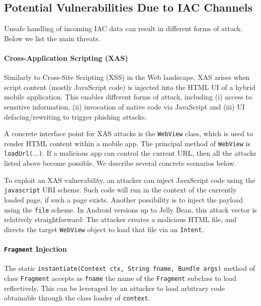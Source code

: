 
\subsection{Potential Vulnerabilities Due to IAC Channels}\label{Se:attackSurface}

Unsafe handling of incoming IAC data can result in different forms of attack. Below we list the main threats.

\paragraph{Cross-Application Scripting (XAS)} Similarly to Cross-Site Scripting (XSS) in the Web landscape, XAS arises when script content (mostly JavaScript code) is injected into the HTML UI of a hybrid mobile application. This enables different forms of attack, including (i) access to sensitive information, (ii) invocation of native code via JavaScript and (iii) UI defacing/rewriting to trigger phishing attacks.

A concrete interface point for XAS attacks is the {\tt WebView} class, which is used to render HTML content within a mobile app. The principal method of {\tt WebView} is {\tt loadUrl($\ldots$)}. If a malicious app can control the current URL, then all the attacks listed above become possible. We describe several concrete scenarios below.

To exploit an XAS vulnerability, an attacker can inject JavaScript code using the {\tt javascript} URI scheme. Such code will run in the context of the currently loaded page, if such a page exists. Another possibility is to inject the payload using the {\tt file} scheme. In Android versions up to Jelly Bean, this attack vector is relatively straightforward: The attacker creates a malicious HTML file, and directs the target {\tt WebView} object to load that file via an {\tt Intent}.

\paragraph{{\tt Fragment} Injection} The static {\tt instantiate(Context ctx, String fname, Bundle args)} method of class {\tt Fragment} accepts as {\tt fname} the name of the {\tt Fragment} subclass to load reflectively. This can be leveraged by an attacker to load arbitrary code obtainable through the class loader of {\tt context}. 

